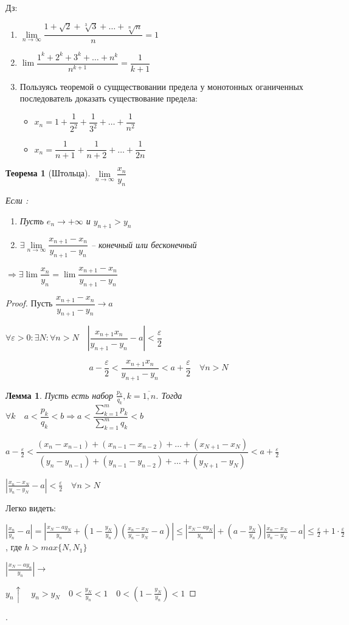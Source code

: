 \documentclass{book}
\newtheorem{Th}{Теорема}[chapter]
\newtheorem{Lm}{Лемма}[chapter]
\begin{document}
Дз:
\begin{enumerate}
	\item $\lim\limits_{n\to \infty}\dfrac{1+\sqrt{2}+\sqrt[3]{3}+\hdots+\sqrt[n]{n}}{n}=1$
	\item $\lim\limits \dfrac{1^k+2^k+3^k+\hdots+n^k}{n^{k+1}}=\dfrac{1}{k+1}$
	\item Пользуясь теоремой о сущществовании предела у монотонных оганиченных последователь доказать существование предела:
	\begin{itemize}
		\item $x_n = 1+\dfrac{1}{2^2}+\dfrac{1}{3^2}+\hdots+\dfrac{1}{n^2}$
		\item $x_n = \dfrac{1}{n+1}+\dfrac{1}{n+2}+\hdots+\dfrac{1}{2n}$
	\end{itemize}
\end{enumerate}

\begin{Th}[Штольца]
	$\lim\limits_{n\to \infty}\dfrac{x_n}{y_n}$
	
	Если :
	\begin{enumerate}
		\item Пусть $e_n \to +\infty$ и $y_{n+1}>y_n$
		\item $\exists \lim\limits_{n\to\infty}\dfrac{x_{n+1}-x_n}{y_{n+1}-y_n}$ -- конечный или бесконечный
	\end{enumerate}
	$\Rightarrow \exists \lim\limits \dfrac{x_n}{y_n}=\lim \dfrac{x_{n+1}-x_n}{y_{n+1}-y_n}$
\end{Th}

\begin{proof}
	Пусть $\dfrac{x_{n+1}-x_n}{y_{n+1}-y_n} \to a$
	
	$\forall \varepsilon >0:\exists N:\forall n > N\quad |\dfrac{x_{n+1}x_n}{y_{n+1}-y_n}-a|<\dfrac{\varepsilon}{2}$
	
	$$a-\frac{\varepsilon}{2}<\dfrac{x_{n+1}x_n}{y_{n+1}-y_n}<a+\frac{\varepsilon}{2}\quad \forall n>N$$
	
	\begin{Lm}
		Пусть есть набор $\frac{p_k}{q_k}, k = \overline{1, n}$. Тогда $\forall k \quad a < \dfrac{p_k}{q_k}<b \Rightarrow  a<\dfrac{\sum\limits_{k=1}^m p_k}{\sum_{k=1}^m q_k}<b$
	\end{Lm}
	
	$a-\frac{\varepsilon}{2}<\dfrac{(x_n-x_{n-1})+(x_{n-1}-x_{n-2})+\dots + (x_{N+1}-x_N)}{(y_n-y_{n-1})+(y_{n-1}-y_{n-2})+\dots + (y_{N+1}-y_N)} < a + \frac{\varepsilon}{2}$
	
	$|\frac{x_n-x_N}{y_n-y_N}-a|<\frac{\varepsilon}{2}\quad \forall n > N$
	
	Легко видеть:
	
	$|\frac{x_n}{y_n}-a|=|\frac{x_N-ay_N}{y_n}+(1- \frac{y_N}{y_n}) (\frac{x_n-x_N}{y_n-y_N} - a)|\leqslant |\frac{x_N-ay_N}{y_n}| +(a-\frac{y_N}{y_n}) |\frac{x_n-x_N}{y_n-y_N}-a| \leqslant \frac{\varepsilon}{2}+1\cdot \frac{\varepsilon}{2}$, где $h>max\{N, N_1\}$
	
	$|\frac{x_N-ay_n}{y_n}|\to $	
	
	$y_n\uparrow\quad y_n>y_N\quad 0<\frac{y_N}{y_n}<1\quad 0<(1-\frac{y_N}{y_n})<1$
\end{proof}
.
\end{document}
